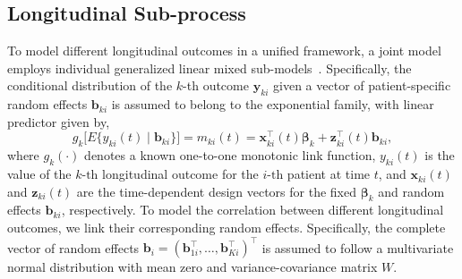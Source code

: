 \documentclass[useAMS, usenatbib, referee]{biom}
\begin{document}
\subsection{Longitudinal Sub-process}
To model different longitudinal outcomes in a unified framework, a joint model employs individual generalized linear mixed sub-models~\citep{mcculloch2005generalized}. Specifically, the conditional distribution of the $k$-th outcome $\boldsymbol{y}_{ki}$ given a vector of patient-specific random effects $\boldsymbol{b}_{ki}$ is assumed to belong to the exponential family, with linear predictor given by,
\begin{equation*}
\label{eq:long_model}
g_k\big[E\{y_{ki} (t) \mid \boldsymbol{b}_{ki}\}\big] = m_{ki}(t) = \boldsymbol{x}_{ki}^{\top}(t)\boldsymbol{\beta}_{k} + \boldsymbol{z}_{ki}^{\top}(t)\boldsymbol{b}_{ki},
\end{equation*}
where $g_k(\cdot)$ denotes a known one-to-one monotonic link function, $y_{ki}(t)$ is the
value of the ${k\mbox{-th}}$ longitudinal outcome for the ${i\mbox{-th}}$ patient at time $t$, and $\boldsymbol{x}_{ki}(t)$ and $\boldsymbol{z}_{ki}(t)$ are the time-dependent design vectors for the fixed $\boldsymbol{\beta}_{k}$ and random effects $\boldsymbol{b}_{ki}$, respectively. To model the correlation between different longitudinal outcomes, we link their corresponding random effects. Specifically, the complete vector of random effects ${\boldsymbol{b}_{i} = (\boldsymbol{b}_{1i}^{\top}, \ldots, \boldsymbol{b}_{Ki}^{\top})^{\top}}$ is assumed to follow a multivariate normal distribution with mean zero and variance-covariance matrix $W$.
\end{document}
